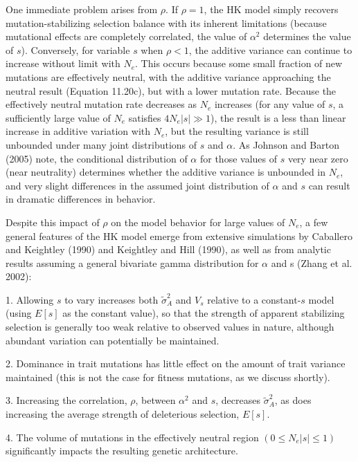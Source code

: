 \documentclass{article}
\begin{document}
One immediate problem arises from $\rho$. If $\rho = 1$, the HK model simply recovers mutation-stabilizing selection balance with its inherent limitations (because mutational effects are completely correlated, the value of $\alpha^2$ determines the value of $s$). Conversely, for variable $s$ when $\rho < 1$, the additive variance can continue to increase without limit with $N_e$. This occurs because some small fraction of new mutations are effectively neutral, with the additive variance approaching the neutral result (Equation 11.20c), but with a lower mutation rate. Because the effectively neutral mutation rate decreases as $N_e$ increases (for any value of $s$, a sufficiently large value of $N_e$ satisfies $4N_e|s| \gg 1$), the result is a less than linear increase in additive variation with $N_e$, but the resulting variance is still unbounded under many joint distributions of $s$ and $\alpha$. As Johnson and Barton (2005) note, the conditional distribution of $\alpha$ for those values of $s$ very near zero (near neutrality) determines whether the additive variance is unbounded in $N_e$, and very slight differences in the assumed joint distribution of $\alpha$ and $s$ can result in dramatic differences in behavior.

Despite this impact of  $ \rho $ on the model behavior for large values of  $ N_{e} $, a few general features of the HK model emerge from extensive simulations by Caballero and Keightley (1990) and Keightley and Hill (1990), as well as from analytic results assuming a general bivariate gamma distribution for  $ \alpha $ and s (Zhang et al. 2002):

1. Allowing $s$ to vary increases both $\widetilde{\sigma}_{A}^{2}$ and $V_{s}$ relative to a constant-$s$ model (using $E[s]$ as the constant value), so that the strength of apparent stabilizing selection is generally too weak relative to observed values in nature, although abundant variation can potentially be maintained.

2. Dominance in trait mutations has little effect on the amount of trait variance maintained (this is not the case for fitness mutations, as we discuss shortly).

3. Increasing the correlation,  $ \rho $, between  $ \alpha^2 $ and  $ s $, decreases  $ \widetilde{\sigma}_A^2 $, as does increasing the average strength of deleterious selection,  $ E[s] $.

4. The volume of mutations in the effectively neutral region  $ (0 \leq N_e | s| \leq 1) $ significantly impacts the resulting genetic architecture.
\end{document}
